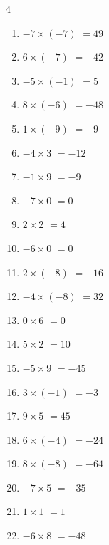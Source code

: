 \begin{multicols}{4}
\begin{enumerate}
  \item $-7\times (-7)$
        $=49$

  \item $6\times (-7)$
        $=-42$

  \item $-5\times (-1)$
        $=5$

  \item $8\times (-6)$
        $=-48$

  \item $1\times (-9)$
        $=-9$

  \item $-4\times 3$
        $=-12$

  \item $-1\times 9$
        $=-9$

  \item $-7\times 0$
        $=0$

  \item $2\times 2$
        $=4$

  \item $-6\times 0$
        $=0$

  \item $2\times (-8)$
        $=-16$

  \item $-4\times (-8)$
        $=32$

  \item $0\times 6$
        $=0$

  \item $5\times 2$
        $=10$

  \item $-5\times 9$
        $=-45$

  \item $3\times (-1)$
        $=-3$

  \item $9\times 5$
        $=45$

\columnbreak %

  \item $6\times (-4)$
        $=-24$

  \item $8\times (-8)$
        $=-64$

  \item $-7\times 5$
        $=-35$

  \item $1\times 1$
        $=1$

  \item $-6\times 8$
        $=-48$


\end{enumerate}
\end{multicols}

